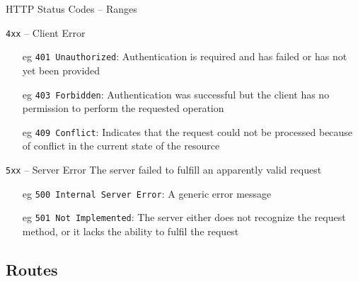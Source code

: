 \documentclass[presentation]{beamer}\mode<presentation>{\usetheme{AMSBolognaFC}}
\begin{document}
\begin{frame}[allowframebreaks]{HTTP Status Codes -- Ranges}
\begin{block}{\texttt{4xx} -- Client Error}
\begin{itemize}
            \item[eg] \alert{\texttt{401 Unauthorized}}: Authentication is required and has failed or has not yet been provided

            \item[eg] \alert{\texttt{403 Forbidden}}: Authentication was successful but the client has no permission to perform the requested operation

            \item[eg] \alert{\texttt{409 Conflict}}: Indicates that the request could not be processed because of conflict in the current state of the resource
        \end{itemize}
    \end{block}

    \begin{block}{\texttt{5xx} -- Server Error}
        The server failed to fulfill an apparently valid request
        \begin{itemize}
            \item[eg] \alert{\texttt{500 Internal Server Error}}: A generic error message

            \item[eg] \alert{\texttt{501 Not Implemented}}: The server either does not recognize the request method, or it lacks the ability to fulfil the request
        \end{itemize}
    \end{block}
\end{frame}

\subsection{Routes}
\end{document}
